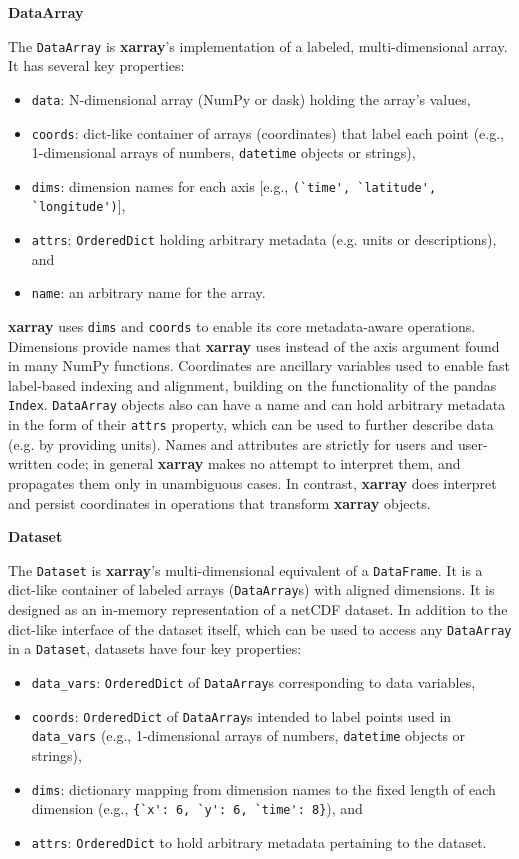 \documentclass{jors}
\begin{document}
\textbf{DataArray}

The \verb|DataArray| is \textbf{xarray}'s implementation of a labeled, multi-dimensional array. It has several key properties:

\begin{itemize}
	\item \verb|data|: N-dimensional array (NumPy or dask) holding the array's values,
	\item \verb|coords|: dict-like container of arrays (coordinates) that label each point (e.g., 1-dimensional arrays of numbers, \verb|datetime| objects or strings),
	\item \verb|dims|: dimension names for each axis [e.g., \verb|(`time', `latitude', `longitude')|],
	\item \verb|attrs|: \verb|OrderedDict| holding arbitrary metadata (e.g. units or descriptions), and
	\item \verb|name|: an arbitrary name for the array.
\end{itemize}

\textbf{xarray} uses \verb|dims| and \verb|coords| to enable its core metadata-aware operations.
Dimensions provide names that \textbf{xarray} uses instead of the axis argument found in many NumPy functions.
Coordinates are ancillary variables used to enable fast label-based indexing and alignment, building on the functionality of the pandas \verb|Index|.
\verb|DataArray| objects also can have a name and can hold arbitrary metadata in the form of their \verb|attrs| property, which can be used to further describe data (e.g. by providing units).
Names and attributes are strictly for users and user-written code; in general \textbf{xarray} makes no attempt to interpret them, and propagates them only in unambiguous cases.
In contrast, \textbf{xarray} does interpret and persist coordinates in operations that transform \textbf{xarray} objects.

\textbf{Dataset}

The \verb|Dataset| is \textbf{xarray}'s multi-dimensional equivalent of a \verb|DataFrame|.
It is a dict-like container of labeled arrays (\verb|DataArray|s) with aligned dimensions.
It is designed as an in-memory representation of a netCDF dataset.
In addition to the dict-like interface of the dataset itself, which can be used to access any \verb|DataArray| in a \verb|Dataset|, datasets have four key properties:

\begin{itemize}
	\item \verb|data_vars|: \verb|OrderedDict| of \verb|DataArray|s corresponding to data variables,
	\item \verb|coords|: \verb|OrderedDict| of \verb|DataArray|s intended to label points used in \verb|data_vars| (e.g., 1-dimensional arrays of numbers, \verb|datetime| objects or strings),
	\item \verb|dims|: dictionary mapping from dimension names to the fixed length of each dimension (e.g., \verb|{`x': 6, `y': 6, `time': 8}|), and
	\item \verb|attrs|: \verb|OrderedDict| to hold arbitrary metadata pertaining to the dataset.
\end{itemize}
\end{document}
